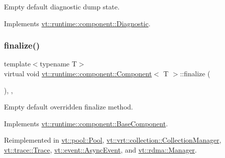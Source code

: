 Empty default diagnostic dump state. 



Implements \hyperlink{structvt_1_1runtime_1_1component_1_1_diagnostic_a1b6da987a14917c7ee8a4d00138e62e6}{vt\+::runtime\+::component\+::\+Diagnostic}.

\mbox{\label{structvt_1_1runtime_1_1component_1_1_component_a098e362de01af6054e5491fba671a959}} 
\subsubsection{\texorpdfstring{finalize()}{finalize()}}
{\footnotesize\ttfamily template$<$typename T$>$ \\
virtual void \hyperlink{structvt_1_1runtime_1_1component_1_1_component}{vt\+::runtime\+::component\+::\+Component}$<$ T $>$\+::finalize (\begin{DoxyParamCaption}{ }\end{DoxyParamCaption})\hspace{0.3cm}{\ttfamily [inline]}, {\ttfamily [override]}, {\ttfamily [virtual]}}



Empty default overridden finalize method. 



Implements \hyperlink{structvt_1_1runtime_1_1component_1_1_base_component_ac03e2177ad2e26b1b8cb94c7e47e3eff}{vt\+::runtime\+::component\+::\+Base\+Component}.



Reimplemented in \hyperlink{structvt_1_1pool_1_1_pool_a45a2880809625a77bb93c3dfcd9c7603}{vt\+::pool\+::\+Pool}, \hyperlink{structvt_1_1vrt_1_1collection_1_1_collection_manager_afafcdbf36f42835471218b654252031c}{vt\+::vrt\+::collection\+::\+Collection\+Manager}, \hyperlink{structvt_1_1trace_1_1_trace_a571333fa708843b1b24079eccfc3ba93}{vt\+::trace\+::\+Trace}, \hyperlink{structvt_1_1event_1_1_async_event_a77e3aafaae98603825556cdf8105ba57}{vt\+::event\+::\+Async\+Event}, and \hyperlink{structvt_1_1rdma_1_1_manager_ad4ff20cf1ba6e870326b20900e6eb581}{vt\+::rdma\+::\+Manager}.

\mbox{\label{structvt_1_1runtime_1_1component_1_1_component_a7f07384d294e59796add9ce6be2d6410}} 
